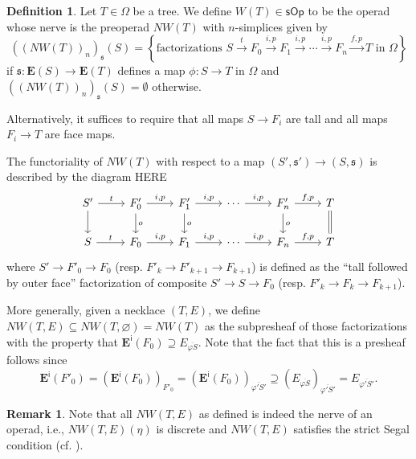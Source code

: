 \documentclass[a4paper,10pt
,draft
]{article}%
\numberwithin{equation}{section}
\numberwithin{figure}{section}
\theoremstyle{definition} %
\newtheorem{definition}[equation]{Definition}%
\newtheorem{remark}[equation]{Remark}%
\newcommand{\1}{\ensuremath{\mathbbm 1}}%
\begin{document}
\begin{definition}\label{NWTNS DEF}
	Let $T \in \Omega$ be a tree.
	We define 
	$W(T) \in \mathsf{sOp}$
	to be the operad whose nerve is the preoperad
	$NW(T)$ with $n$-simplices given by
\[
	\left(\left(NW(T)\right)_n\right)_{\mathfrak{s}}(S)
=
\left\{
\text{factorizations }
S \xrightarrow{t} 
F_0 \xrightarrow{i,p} 
F_1 \xrightarrow{i,p} 
\cdots \xrightarrow{i,p}
F_n \xrightarrow{f,p}
T
\text{ in $\Omega$}
\right\}
\]
if $\mathfrak{s} \colon \boldsymbol{E}(S) \to \boldsymbol{E}(T)$
defines a map $\phi \colon S \to T$ in $\Omega$
and
$\left(\left(NW(T)\right)_n\right)_{\mathfrak{s}}(S) = \emptyset$
otherwise.
	
Alternatively, it suffices to require that all maps
$S \to F_i$ are tall
and all maps $F_i \to T$ are face maps.

The functoriality of 
$NW(T)$
with respect to a map $(S', \mathfrak s') \to ({S},\mathfrak{s})$
is described by the diagram
{\color{red} HERE}
\[
\begin{tikzcd}
	S' \ar{r}{t} \ar{d}
&
	F'_0 \ar{r}{i,p} \ar{d}{o}
&
	F'_1 \ar{r}{i,p} \ar{d}{o}
&
	\cdots \ar{r}{i,p}
&
	F'_n \ar{r}{f,p} \ar{d}{o}
&
	T \ar[equal]{d}
\\
	S \ar{r}{t} 
&
	F_0 \ar{r}{i,p}
&
	F_1 \ar{r}{i,p}
&
	\cdots \ar{r}{i,p}
&
	F_n \ar{r}{f,p}
&
	T	
\end{tikzcd}
\]
where 
$S' \to F'_0 \to F_0$
(resp. $F'_k \to F'_{k+1} \to F_{k+1}$)
is defined as the ``tall followed by outer face''
factorization of composite
$S' \to S \to F_0$
(resp. $F'_k \to F_{k} \to F_{k+1}$).


More generally, 
given a necklace $(T,E)$,
we define
$NW(T,E) \subseteq NW(T,\varnothing) = NW(T)$
as the subpresheaf
of those factorizations with the property that
$\boldsymbol{E}^{\mathsf{i}}(F_0) \supseteq E_{\overline{\varphi S}}$.
Note that the fact that this is a presheaf follows 
since
\[
\boldsymbol{E}^{\mathsf{i}}(F'_0)
	=
\left(\boldsymbol{E}^{\mathsf{i}}(F_0)\right)_{F'_0}
	=
\left(\boldsymbol{E}^{\mathsf{i}}(F_0)\right)_{\overline{\varphi' S'}}
	\supseteq 
\left(E_{\overline{\varphi S}}\right)_{\overline{\varphi' S'}}
	= 
E_{\overline{\varphi' S'}}.
\]
\end{definition}



\begin{remark}
	Note that all
	$NW(T,E)$ as defined is indeed the nerve of an operad, i.e., 
	$NW(T,E)(\eta)$ is discrete
	and
	$NW(T,E)$ satisfies the strict Segal condition
        (cf. \cite[Cor 3.69]{BP_geo}).
\end{remark}
\end{document}
